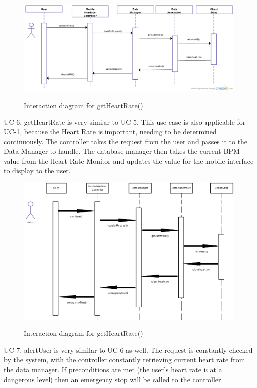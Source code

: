 \documentclass[letterpaper,english, 12pt]{scrreprt}
\begin{document}
\begin{figure}[H]
	\includegraphics[scale=.40]{img/Interaction_Diagrams/getHeartRate.png}\\
	\caption {Interaction diagram for getHeartRate()} 
\end{figure}

UC-6, getHeartRate is very similar to UC-5. This use case is also applicable for UC-1, because the Heart Rate is important, needing to be determined continuously. The controller takes the request from the user and passes it to the Data Manager to handle. The database manager then takes the current BPM value from the Heart Rate Monitor and updates the value for the mobile interface to display to the user. 

\begin{figure}[H]
	\includegraphics[scale=.40]{img/Interaction_Diagrams/alertUser.png}\\
	\caption {Interaction diagram for getHeartRate()} 
\end{figure}

UC-7, alertUser is very similar to UC-6 as well. The request is constantly checked by the system, with the controller constantly retrieving current heart rate from the data manager. If preconditions are met (the user's heart rate is at a dangerous level) then an emergency stop will be called to the controller.
\end{document}
